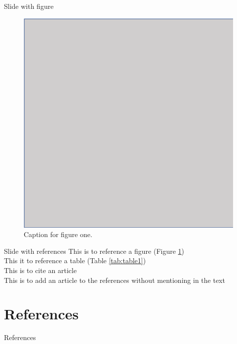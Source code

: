 \documentclass{beamer}					%
\begin{document}
\begin{frame}{Slide with figure}
	\begin{figure}[H]
		\centering
        \includegraphics[width=.5\textwidth]{figures/figure1.png}
        \caption{Caption for figure one.}
        \label{fig:figure1}
	\end{figure}
\end{frame}

\begin{frame}{Slide with references}
	This is to reference a figure (Figure \ref{fig:figure1})\\
    This it to reference a table (Table \ref{tab:table1})\\
    This is to cite an article \cite{Ahmed2018a}\\
    This is to add an article to the references without mentioning in the text \nocite{Ahmed2018a}\\
\end{frame}
\section{References}

\begin{frame}[allowframebreaks]{References}
	\tiny
	
\end{frame}
\end{document}
